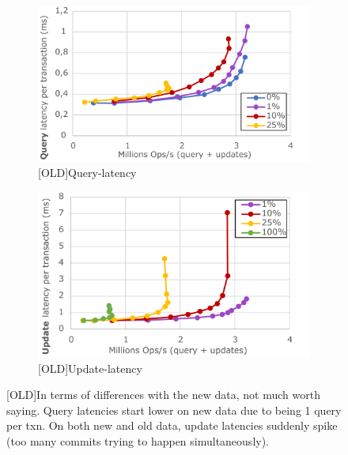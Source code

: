 \documentclass[sigplan,10pt]{acmart}
\begin{document}
\begin{figure}[h]
	\centering
	\begin{subfigure}{.47\linewidth}
		\centering
		\includegraphics[width=1\linewidth]{updRate_queryLatency_cut}
		\caption{[OLD]Query-latency}
		\label{fig:(new)update_rates_query}
	\end{subfigure}%
	\hspace*{3em}
	\begin{subfigure}{.47\linewidth}
		\centering
		\includegraphics[width=1\linewidth]{updRate_updateLatency_cut}
		\caption{[OLD]Update-latency}
		\label{fig:(new)update_rates_update}
	\end{subfigure}
	\caption{[OLD]In terms of differences with the new data, not much worth saying. Query latencies start lower on new data due to being 1 query per txn. On both new and old data, update latencies suddenly spike (too many commits trying to happen simultaneously).}
	\label{fig:(new)update_rates_split}
\end{figure}
\end{document}
